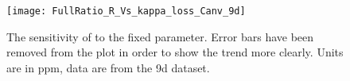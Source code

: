  


\begin{figure}
    \centering
    \texttt{[image: FullRatio\_R\_Vs\_kappa\_loss\_Canv\_9d]}
    \caption[Scan over fixed \K]{The sensitivity of \R to the fixed \K parameter. Error bars have been removed from the plot in order to show the trend more clearly. Units are in ppm, data are from the 9d dataset.}
    \label{fig:kappaLossScan}
\end{figure}


